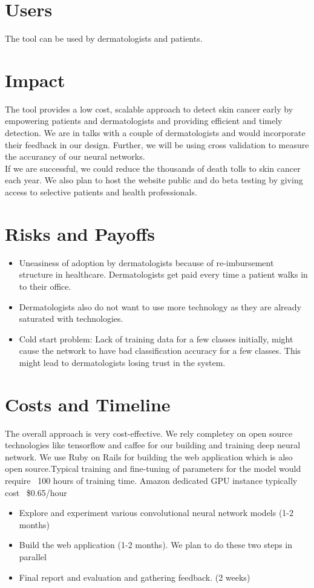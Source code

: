 \documentclass[a4paper,10pt]{article}
\begin{document}
\section{Users}
The tool can be used by dermatologists and patients.

\section{Impact}
The tool provides a low cost, scalable approach to detect skin cancer early by empowering patients and dermatologists and providing
efficient and timely detection. We are in talks with a couple of dermatologists and would incorporate their feedback in our design.
Further, we will be using cross validation to measure the accurancy of our neural networks.\\
If we are successful, we could reduce the thousands of death tolls to skin cancer each year. We also plan to host the
website public and do beta testing by giving access to selective patients and health professionals.

\section{Risks and Payoffs}
\begin{itemize}
 \item Uneasiness of adoption by dermatologists because of re-imbursement structure in healthcare. Dermatologists get paid every time a patient
 walks in to their office.
 \item Dermatologists also do not want to use more technology as they are already saturated with technologies.
 \item Cold start problem: Lack of training data for a few classes initially, might cause the network to have bad classification accuracy for a
 few classes. This might lead to dermatologists losing trust in the system.
\end{itemize}

\section{Costs and Timeline}
The overall approach is very cost-effective. We rely completey on open source technologies like tensorflow\cite{tensorflow2015-whitepaper} and caffee\cite{jia2014caffe} for our building and training
deep neural network. We use Ruby on Rails for building the web application which is also open source.Typical training and fine-tuning of parameters
for the model would require ~100 hours of training time.  Amazon dedicated GPU instance
typically cost ~\$0.65/hour
\begin{itemize}
 \item Explore and experiment various convolutional neural network models (1-2 months)
 \item Build the web application (1-2 months). We plan to do these two steps in parallel
 \item Final report and evaluation and gathering feedback. (2 weeks)
\end{itemize}
\end{document}
